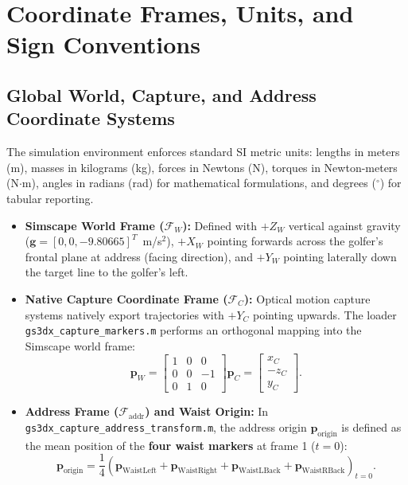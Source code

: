 \documentclass[11pt,a4paper]{article}
\begin{document}
\section{Coordinate Frames, Units, and Sign Conventions}

\subsection{Global World, Capture, and Address Coordinate Systems}
The simulation environment enforces standard SI metric units: lengths in meters (m), masses in kilograms (kg), forces in Newtons (N), torques in Newton-meters (N$\cdot$m), angles in radians (rad) for mathematical formulations, and degrees ($^\circ$) for tabular reporting.

\begin{itemize}
    \item \textbf{Simscape World Frame ($\mathcal{F}_W$):} Defined with $+Z_W$ vertical against gravity ($\mathbf{g} = [0, 0, -9.80665]^T$~m/s$^2$), $+X_W$ pointing forwards across the golfer's frontal plane at address (facing direction), and $+Y_W$ pointing laterally down the target line to the golfer's left.
    \item \textbf{Native Capture Coordinate Frame ($\mathcal{F}_C$):} Optical motion capture systems natively export trajectories with $+Y_C$ pointing upwards. The loader \texttt{gs3dx\_capture\_markers.m} performs an orthogonal mapping into the Simscape world frame:
    \begin{equation}
        \mathbf{p}_W = \begin{bmatrix} 1 & 0 & 0 \\ 0 & 0 & -1 \\ 0 & 1 & 0 \end{bmatrix} \mathbf{p}_C = \begin{bmatrix} x_C \\ -z_C \\ y_C \end{bmatrix}.
    \end{equation}
    \item \textbf{Address Frame ($\mathcal{F}_{\text{addr}}$) and Waist Origin:} In \texttt{gs3dx\_capture\_address\_transform.m}, the address origin $\mathbf{p}_{\text{origin}}$ is defined as the mean position of the \textbf{four waist markers} at frame 1 ($t = 0$):
    \begin{equation}
        \mathbf{p}_{\text{origin}} = \frac{1}{4} \left(\mathbf{p}_{\text{WaistLeft}} + \mathbf{p}_{\text{WaistRight}} + \mathbf{p}_{\text{WaistLBack}} + \mathbf{p}_{\text{WaistRBack}}\right)_{t=0}.

\end{equation}
\end{itemize}
\end{document}
